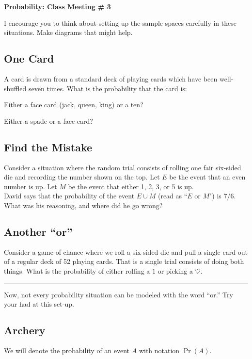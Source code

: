 \documentclass[12pt]{amsart}
\theoremstyle{definition}
\begin{document}
\begin{center}
\textbf{\Huge
Probability: Class Meeting \# 3
}
\end{center}
\vspace{.5in}

I encourage you to think about setting up the sample spaces carefully in these situations.
Make diagrams that might help.

\subsection*{One Card}
A card is drawn from a standard deck of playing cards which have been well-shuffled seven times.
What is the probability that the card is:
\begin{compactitem}
\item Either a face card (jack, queen, king) or a ten?
\item Either a spade or a face card?\\
\end{compactitem}

\subsection*{Find the Mistake}
Consider a situation where the random trial consists of rolling one fair six-sided die and recording the number shown on the top.
Let $E$ be the event that an even number is up. Let $M$ be the event that either 1, 2, 3, or 5 is up.\\

David says that the probability of the event $E \cup M$ (read as ``$E$ or $M$") is 7/6. What was his reasoning, and where did he go wrong?

\subsection*{Another ``or''}
Consider a game of chance where we roll a six-sided die and pull a single card out of a regular deck of 52 playing cards.
That is a single trial consists of doing both things.
What is the probability of either rolling a $1$ or picking a $\heartsuit$.

\vspace{.5in}
\hrule
\vspace{.25in}

Now, not every probability situation can be modeled with the word ``or.''
Try your had at this set-up.

\subsection*{Archery}
We will denote the probability of an event $A$ with notation $\Pr(A)$.
\end{document}
